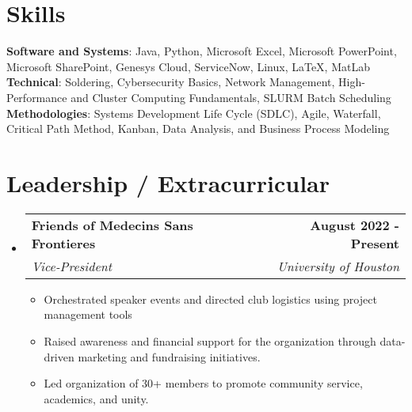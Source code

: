 \documentclass[letterpaper,11pt]{article}
\makeatletter
\newcommand{\resumeItem}[1]{
  \item\small{
    {#1 \vspace{-2pt}}
  }
}
\newcommand{\resumeSubheading}[4]{
  \vspace{-2pt}\item
    \begin{tabular*}{1.0\textwidth}[t]{l@{\extracolsep{\fill}}r}
      \textbf{#1} & \textbf{\small #2} \\
      \textit{\small#3} & \textit{\small #4} \\
    \end{tabular*}\vspace{-7pt}
}
\newcommand{\resumeSubHeadingListStart}{\begin{itemize}[leftmargin=0.0in, label={}]}
\newcommand{\resumeSubHeadingListEnd}{\end{itemize}}
\newcommand{\resumeItemListStart}{\begin{itemize}}
\newcommand{\resumeItemListEnd}{\end{itemize}\vspace{-5pt}}
\makeatother
\begin{document}
%
\section{Skills}
 \begin{itemize}[leftmargin=0.15in, label={}]
    \small{\item{
     \textbf{Software and Systems}{: Java, Python, Microsoft Excel, Microsoft PowerPoint, Microsoft SharePoint, Genesys Cloud, ServiceNow, Linux, LaTeX, MatLab } \\
     \textbf{Technical}{: Soldering, Cybersecurity Basics, Network Management, High-Performance and Cluster Computing Fundamentals, SLURM Batch Scheduling} \\
     \textbf{Methodologies}{: Systems Development Life Cycle (SDLC), Agile, Waterfall, Critical Path Method, Kanban, Data Analysis, and Business Process Modeling } \\
    }}
 \end{itemize}
 \vspace{-16pt}


\section{Leadership / Extracurricular}
    \resumeSubHeadingListStart
        \resumeSubheading{Friends of Medecins Sans Frontieres}{August 2022 - Present}{Vice-President}{University of Houston}
           \vspace{5pt}
            \resumeItemListStart
                \resumeItem{Orchestrated speaker events and directed club logistics using project management tools}
                \resumeItem{Raised awareness and financial support for the organization through data-driven marketing and fundraising initiatives. }
                \resumeItem{Led organization of 30+ members to promote community service, academics, and unity.}
            \resumeItemListEnd
        
    \resumeSubHeadingListEnd
\end{document}
